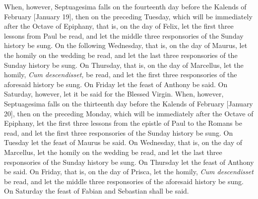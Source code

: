 \documentclass[openany]{book}
\renewcommand{\\}{\par\hspace*{.25em}} %
\renewcommand{\newline}{\par}
\begin{document}
\newline When, however, Septuagesima falls on the fourteenth day before the Kalends of February [January 19], then on the preceding Tuesday, which will be immediately after the Octave of Epiphany, that is, on the day of Felix, let the first three lessons from Paul be read, and let the middle three responsories of the Sunday history be sung. On the following Wednesday, that is, on the day of Maurus, let the homily on the wedding be read, and let the last three responsories of the Sunday history be sung. On Thursday, that is, on the day of Marcellus, let the homily, \emph{Cum descendisset,} be read, and let the first three responsories of the aforesaid history be sung. On Friday let the feast of Anthony be said. On Saturday, however, let it be said for the Blessed Virgin.
When, however, Septuagesima falls on the thirteenth day before the Kalends of February [January 20], then on the preceding Monday, which will be immediately after the Octave of Epiphany, let the first three lessons from the epistle of Paul to the Romans be read, and let the first three responsories of the Sunday history be sung. On Tuesday let the feast of Maurus be said. On Wednesday, that is, on the day of Marcellus, let the homily on the wedding be read, and let the last three responsories of the Sunday history be sung. On Thursday let the feast of Anthony be said. On Friday, that is, on the day of Prisca, let the homily, \emph{Cum descendisset} be read, and let the middle three responsories of the aforesaid history be sung. On Saturday the feast of Fabian and Sebastian shall be said.
\end{document}
